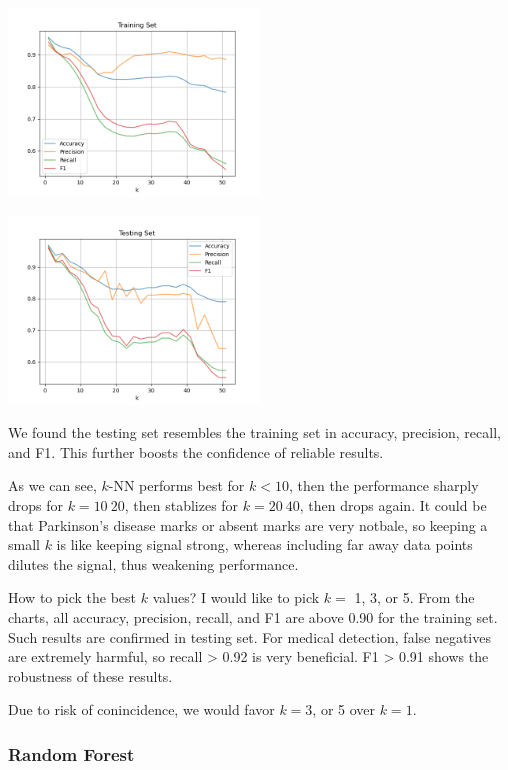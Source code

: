 \includegraphics[width=0.5\textwidth]{./figures/knn_parkinsons_training_True.png}

\includegraphics[width=0.5\textwidth]{./figures/knn_parkinsons_testing_True.png}


We found the testing set resembles the training set in accuracy, precision, recall, and F1. This further boosts the confidence of reliable results.  

As we can see, $k$-NN performs best for $k<10$, then the performance sharply drops for $k=10~20$, then stablizes for $k=20~40$, then drops again. It could be that Parkinson's disease marks or absent marks are very notbale, so keeping a small $k$ is like keeping signal strong, whereas including far away data points dilutes the signal, thus weakening performance.

How to pick the best $k$ values? I would like to pick $k=$ 1, 3, or 5. From the charts, all accuracy, precision, recall, and F1 are above 0.90 for the training set. Such results are confirmed in testing set. For medical detection, false negatives are extremely harmful, so recall > 0.92 is very beneficial. F1 > 0.91 shows the robustness of these results. 

Due to risk of conincidence, we would favor $k=3$, or 5 over $k = 1$.  


\newpage

\subsubsection{Random Forest}

